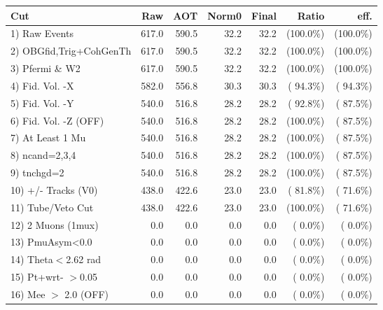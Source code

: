  \begin{table}[h!]\centering
 \begin{tabular}{||l||r|r|r|r|r|r||}
 \hline
 \hline
 Cut & Raw & AOT & Norm0 & Final & Ratio & eff.       \\
 \hline
  1) Raw Events           &        617.0 &        590.5 &         32.2 &         32.2 & (100.0\%) & (100.0\%) \\
  2) OBGfid,Trig+CohGenTh &        617.0 &        590.5 &         32.2 &         32.2 & (100.0\%) & (100.0\%) \\
  3) Pfermi \& W2         &        617.0 &        590.5 &         32.2 &         32.2 & (100.0\%) & (100.0\%) \\
  4) Fid. Vol. -X         &        582.0 &        556.8 &         30.3 &         30.3 & ( 94.3\%) & ( 94.3\%) \\
  5) Fid. Vol. -Y         &        540.0 &        516.8 &         28.2 &         28.2 & ( 92.8\%) & ( 87.5\%) \\
  6) Fid. Vol. -Z (OFF)   &        540.0 &        516.8 &         28.2 &         28.2 & (100.0\%) & ( 87.5\%) \\
  7) At Least 1 Mu        &        540.0 &        516.8 &         28.2 &         28.2 & (100.0\%) & ( 87.5\%) \\
  8) ncand=2,3,4          &        540.0 &        516.8 &         28.2 &         28.2 & (100.0\%) & ( 87.5\%) \\
  9) tnchgd=2             &        540.0 &        516.8 &         28.2 &         28.2 & (100.0\%) & ( 87.5\%) \\
 10) +/- Tracks (V0)      &        438.0 &        422.6 &         23.0 &         23.0 & ( 81.8\%) & ( 71.6\%) \\
 11) Tube/Veto Cut        &        438.0 &        422.6 &         23.0 &         23.0 & (100.0\%) & ( 71.6\%) \\
 12) 2 Muons (1mux)       &          0.0 &          0.0 &          0.0 &          0.0 & (  0.0\%) & (  0.0\%) \\
 13) PmuAsym<0.0          &          0.0 &          0.0 &          0.0 &          0.0 & (  0.0\%) & (  0.0\%) \\
 14) Theta$<$2.62 rad     &          0.0 &          0.0 &          0.0 &          0.0 & (  0.0\%) & (  0.0\%) \\
 15) Pt+wrt- $>$0.05      &          0.0 &          0.0 &          0.0 &          0.0 & (  0.0\%) & (  0.0\%) \\
 16) Mee $>$ 2.0  (OFF)   &          0.0 &          0.0 &          0.0 &          0.0 & (  0.0\%) & (  0.0\%) \\

\end{tabular}
\end{table}
